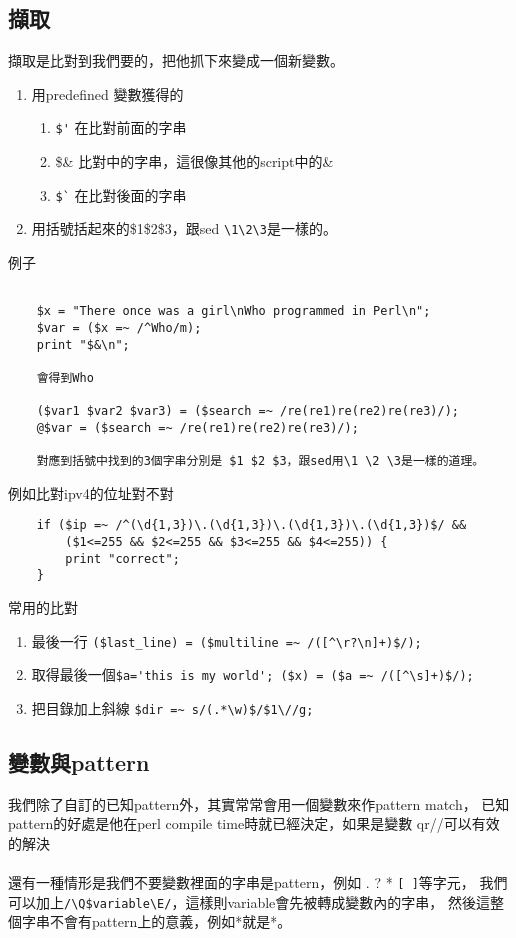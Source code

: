     \subsection{擷取}
    擷取是比對到我們要的，把他抓下來變成一個新變數。
    \begin{enumerate}
    \item 用predefined 變數獲得的
	\begin{enumerate}
	\item \verb=$'=	在比對前面的字串
	\item \$\&	比對中的字串，這很像其他的script中的\&
	\item \verb=$`=	在比對後面的字串
	\end{enumerate}
    \item 用括號括起來的\$1\$2\$3，跟sed \verb=\1\2\3=是一樣的。
    \end{enumerate}
    例子
    \begin{verbatim}

    $x = "There once was a girl\nWho programmed in Perl\n";
    $var = ($x =~ /^Who/m);
    print "$&\n";

    會得到Who

    ($var1 $var2 $var3) = ($search =~ /re(re1)re(re2)re(re3)/);
    @$var = ($search =~ /re(re1)re(re2)re(re3)/);

    對應到括號中找到的3個字串分別是 $1 $2 $3，跟sed用\1 \2 \3是一樣的道理。
    \end{verbatim}
    例如比對ipv4的位址對不對
    \begin{verbatim}
    if ($ip =~ /^(\d{1,3})\.(\d{1,3})\.(\d{1,3})\.(\d{1,3})$/ &&
        ($1<=255 && $2<=255 && $3<=255 && $4<=255)) {
        print "correct";
    }
    \end{verbatim}
    常用的比對
    \begin{enumerate} 
      \item 最後一行 \verb|($last_line) = ($multiline =~ /([^\r?\n]+)$/);|
      \item 取得最後一個\verb|$a='this is my world'; ($x) = ($a =~ /([^\s]+)$/);|
      \item 把目錄加上斜線 \verb|$dir =~ s/(.*\w)$/$1\//g;|
    \end{enumerate}

    \subsection{變數與pattern}
    我們除了自訂的已知pattern外，其實常常會用一個變數來作pattern match，
    已知pattern的好處是他在perl compile time時就已經決定，如果是變數
    qr//可以有效的解決
    \\\\
    還有一種情形是我們不要變數裡面的字串是pattern，例如 . ? * \verb=[ ]=等字元，
    我們可以加上\verb=/\Q$variable\E/=，這樣則variable會先被轉成變數內的字串，
    然後這整個字串不會有pattern上的意義，例如*就是*。
